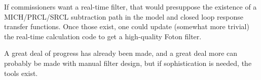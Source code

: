 If commissioners want a real-time filter, that would presuppose the existence of a MICH/PRCL/SRCL subtraction path in the model and closed loop response transfer functions. Once those exist, one could update (somewhat more trivial) the real-time calculation code to get a high-quality Foton filter.

A great deal of progress has already been made, and a great deal more can probably be made with manual filter design, but if sophistication is needed, the tools exist.




%
%

%

